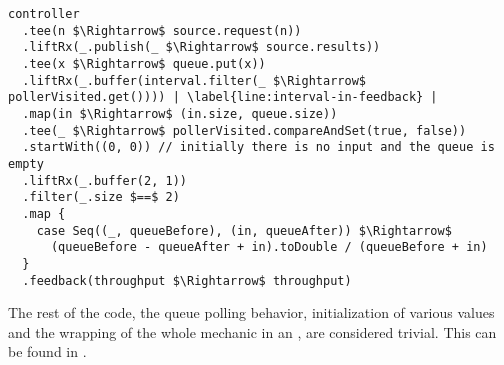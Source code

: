 \hspace*{-\parindent}
\begin{minipage}{\linewidth}
\begin{lstlisting}[style=ScalaStyle, caption={Feedback system for controlling the buffer}, label={lst:buffer-feedback-control}]
controller
  .tee(n $\Rightarrow$ source.request(n))
  .liftRx(_.publish(_ $\Rightarrow$ source.results))
  .tee(x $\Rightarrow$ queue.put(x))
  .liftRx(_.buffer(interval.filter(_ $\Rightarrow$ pollerVisited.get()))) | \label{line:interval-in-feedback} |
  .map(in $\Rightarrow$ (in.size, queue.size))
  .tee(_ $\Rightarrow$ pollerVisited.compareAndSet(true, false))
  .startWith((0, 0)) // initially there is no input and the queue is empty
  .liftRx(_.buffer(2, 1))
  .filter(_.size $==$ 2)
  .map {
    case Seq((_, queueBefore), (in, queueAfter)) $\Rightarrow$
      (queueBefore - queueAfter + in).toDouble / (queueBefore + in)
  }
  .feedback(throughput $\Rightarrow$ throughput)
\end{lstlisting}
\end{minipage}

The rest of the code, the queue polling behavior, initialization of various values and the wrapping of the whole mechanic in an , are considered trivial. This can be found in .
